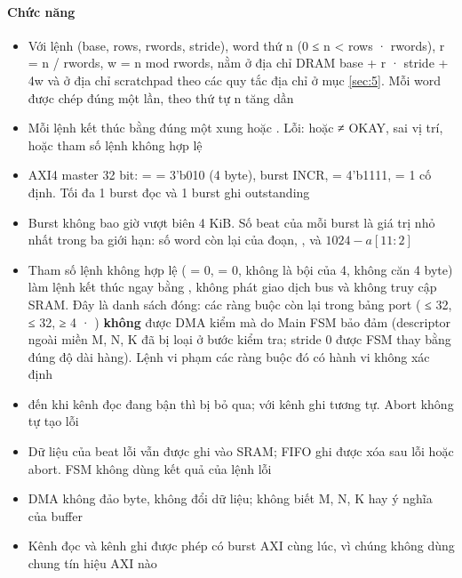 \documentclass[10pt,a4paper]{article}
\begin{document}
\paragraph{Chức năng}
\begin{itemize}
\item Với lệnh (base, rows, rwords, stride), word thứ n (0 ≤ n < rows · rwords), r = n / rwords, w = n mod rwords, nằm ở địa chỉ DRAM base + r · stride + 4w và ở địa chỉ scratchpad theo các quy tắc địa chỉ ở mục \ref{sec:5}. Mỗi word được chép đúng một lần, theo thứ tự n tăng dần
\item Mỗi lệnh kết thúc bằng đúng một xung  hoặc . Lỗi:  hoặc  ≠ OKAY,  sai vị trí, hoặc tham số lệnh không hợp lệ
\item AXI4 master 32 bit:  =  = 3'b010 (4 byte), burst INCR,  = 4'b1111,  = 1 cố định. Tối đa 1 burst đọc và 1 burst ghi outstanding
\item Burst không bao giờ vượt biên 4 KiB. Số beat của mỗi burst là giá trị nhỏ nhất trong ba giới hạn: số word còn lại của đoạn, , và $1024 - a[11{:}2]$
\item Tham số lệnh không hợp lệ ( = 0,  = 0,  không là bội của 4,  không căn 4 byte) làm lệnh kết thúc ngay bằng , không phát giao dịch bus và không truy cập SRAM. Đây là danh sách đóng: các ràng buộc còn lại trong bảng port ( ≤ 32,  ≤ 32,  ≥ 4 · ) \textbf{không} được DMA kiểm mà do Main FSM bảo đảm (descriptor ngoài miền M, N, K đã bị loại ở bước kiểm tra; stride 0 được FSM thay bằng đúng độ dài hàng). Lệnh vi phạm các ràng buộc đó có hành vi không xác định
\item {} đến khi kênh đọc đang bận thì bị bỏ qua;  với kênh ghi tương tự. Abort không tự tạo lỗi
\item Dữ liệu của beat lỗi vẫn được ghi vào SRAM; FIFO ghi được xóa sau lỗi hoặc abort. FSM không dùng kết quả của lệnh lỗi
\item DMA không đảo byte, không đổi dữ liệu; không biết M, N, K hay ý nghĩa của buffer
\item Kênh đọc và kênh ghi được phép có burst AXI cùng lúc, vì chúng không dùng chung tín hiệu AXI nào
\end{itemize}

\end{document}
